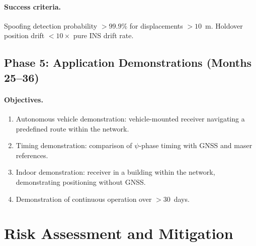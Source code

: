 \documentclass[11pt,a4paper]{article}
\begin{document}
\paragraph{Success criteria.}
Spoofing detection probability $> 99.9\%$ for displacements $> 10$~m.
Holdover position drift $< 10\times$ pure INS drift rate.

\subsection{Phase 5: Application Demonstrations (Months 25--36)}

\paragraph{Objectives.}
\begin{enumerate}
\item Autonomous vehicle demonstration: vehicle-mounted receiver
  navigating a predefined route within the network.
\item Timing demonstration: comparison of $\psi$-phase timing with
  GNSS and maser references.
\item Indoor demonstration: receiver in a building within the network,
  demonstrating positioning without GNSS.
\item Demonstration of continuous operation over $> 30$~days.
\end{enumerate}

\section{Risk Assessment and Mitigation}
\end{document}
